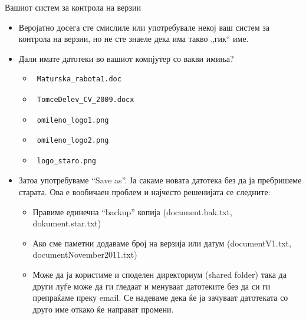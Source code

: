 \begin{frame}[fragile,shrink=10]{Вашиот систем за контрола на верзии}
\begin{itemize}
\item Веројатно досега сте смислиле или употребувале некој ваш систем за
контрола на верзии, но не сте знаеле дека има такво „гик“ име.
\item Дали имате датотеки во вашиот компјутер со вакви имиња?
    \begin{itemize}
    \item \begin{verbatim} Maturska_rabota1.doc \end{verbatim}
    \item \begin{verbatim} TomceDelev_CV_2009.docx \end{verbatim}
    \item \begin{verbatim} omileno_logo1.png \end{verbatim}
    \item \begin{verbatim} omileno_logo2.png \end{verbatim}
    \item \begin{verbatim} logo_staro.png \end{verbatim}
    \end{itemize}
\item Затоа употребуваме ``Save as''. Ја сакаме новата датотека без да ја
пребришеме старата. Ова е вообичаен проблем и најчесто решенијата се следните:
    \begin{itemize}
    \item Правиме единечна ``backup'' копија (document.bak.txt, dokument.star.txt)
    \item Ако сме паметни додаваме број на верзија или датум (documentV1.txt,
    documentNovember2011.txt)
    \item Може да ја користиме и споделен директориум (shared folder) така да
    други луѓе може да ги гледаат и менуваат датотеките без да си ги препраќаме преку
    email. Се надеваме дека ќе ја зачуваат датотеката со друго име откако ќе
    направат промени.
    \end{itemize}
\end{itemize}
\end{frame}    
    
